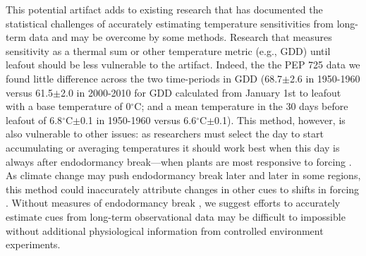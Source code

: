 \documentclass{article}
\begin{document}
\par This potential artifact adds to existing research that has documented the statistical challenges of accurately estimating temperature sensitivities from long-term data \citep{gusewell2017,clark2014a} and may be overcome by some methods. Research that measures sensitivity as a thermal sum or other temperature metric (e.g., GDD) until leafout should be less vulnerable to the artifact. Indeed, the the PEP 725 data we found little difference across the two time-periods in GDD (68.7$\pm$2.6 in 1950-1960 versus 61.5$\pm$2.0 in 2000-2010 for GDD calculated from January 1st to leafout with a base temperature of 0$^{\circ}$C; and a mean temperature in the 30 days before leafout of 6.8$^{\circ}$C$\pm$0.1 in 1950-1960 versus 6.6$^{\circ}$C$\pm$0.1). This method, however, is also vulnerable to other issues: as researchers must select the day to start accumulating or averaging temperatures it should work best when this day is always after endodormancy break---when plants are most responsive to forcing \citep{chuine2016}. As climate change may push endodormancy break later and later in some regions, this method could inaccurately attribute changes in other cues to shifts in forcing \citep{gusewell2017}. Without measures of endodormancy break \citep{chuine2016}, we suggest efforts to accurately estimate cues from long-term observational data may be difficult to impossible without additional physiological information from controlled environment experiments.


\end{document}
